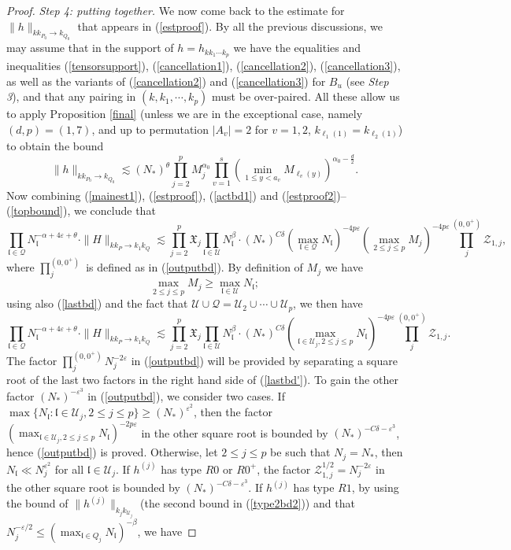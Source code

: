 \documentclass[11 pt,reqno]{amsart}
\theoremstyle{definition}
\theoremstyle{remark}
\numberwithin{equation}{section}
\newcommand{\Qc}{\mathcal{Q}}
\newcommand{\Uc}{\mathcal{U}}
\newcommand{\Zc}{\mathcal{Z}}
\newcommand{\Xf}{\mathfrak{X}}
\newcommand{\lf}{\mathfrak{l}}
\begin{document}
{\begin{proof}
  \emph{Step 4: putting together.} We now come back to the estimate for $\|h\|_{kk_{P_0}\to k_{Q_0}}$ that appears in (\ref{estproof}). By all the previous discussions, we may assume that in the support of $h=h_{kk_1\cdots k_p}$ we have the equalities and inequalities (\ref{tensorsupport}), (\ref{cancellation1}), (\ref{cancellation2}), (\ref{cancellation3}), as well as the variants of (\ref{cancellation2}) and (\ref{cancellation3}) for $B_u$ (see \emph{Step 3}), and that any pairing in $(k,k_1,\cdots,k_p)$ must be over-paired.  All these allow us to apply Proposition \ref{final} (unless we are in the exceptional case, namely $(d,p)=(1,7)$, and up to permutation $|A_v|=2$ for $v=1, 2$, $k_{\ell_1(1)}=k_{\ell_2(1)}$) to obtain the bound
\begin{equation}
\label{topbound}\|h\|_{kk_{P_0}\to k_{Q_0}}\lesssim (N_*)^\theta\prod_{j=2}^{p}M_j^{\alpha_0}\prod_{v=1}^s(\min_{1\leq y<a_v}M_{\ell_v(y)})^{\alpha_0-\frac{d}{2}}.
\end{equation} Now combining (\ref{mainest1}), (\ref{estproof}), (\ref{actbd1}) and (\ref{estproof2})--(\ref{topbound}), we conclude that
\begin{equation}\label{lastbd}\prod_{\lf\in\Qc}N_\lf^{-\alpha+4\varepsilon+\theta}\cdot\|H\|_{kk_P\to k_1k_Q}\lesssim \prod_{j=2}^{p}\Xf_j\prod_{\lf\in\Uc}N_\lf^\beta\cdot (N_*)^{C\delta}(\max_{\lf\in\Qc}N_\lf)^{-4p\varepsilon}(\max_{2\leq j\leq p}M_j)^{-4p\varepsilon}\prod_j^{(0,0^+)}\Zc_{1,j},
\end{equation} 
where $\prod_j^{(0,0^+)}$ is defined as in (\ref{outputbd}). By definition of $M_j$ we have \[
\max_{2\leq j\leq p}M_j\geq\max_{\lf\in\Uc}N_\lf;\]
using also (\ref{lastbd}) and the fact that $\Uc \cup \Qc =\Uc_2\cup\cdots\cup \Uc_p$, we then have 
\begin{equation}\label{lastbd'}\prod_{\lf\in\Qc}N_\lf^{-\alpha+4\varepsilon+\theta}\cdot\|H\|_{kk_P\to k_1k_Q}\lesssim \prod_{j=2}^{p}\Xf_j\prod_{\lf\in\Uc}N_\lf^\beta\cdot (N_*)^{C\delta}(\max_{\lf\in\Uc_j, 2\leq j\leq p}N_\lf)^{-4p\varepsilon}\prod_j^{(0,0^+)}\Zc_{1,j}.
\end{equation} 
The factor $\prod_{j}^{(0,0^+)}N_j^{-2\varepsilon}$ in (\ref{outputbd}) will be provided by separating a square root of  the last two factors in the right hand side of (\ref{lastbd'}). 
To gain the other factor $(N_*)^{-\varepsilon^3}$ in (\ref{outputbd}), we consider two cases.
If $\max\{N_\lf:\lf\in\Uc_j,2\leq j\leq p\}\geq (N_*)^{\varepsilon^2}$, then the factor $(\max_{\lf\in\Uc_j, 2\leq j\leq p}N_\lf)^{-2p\varepsilon}$ in the other square root is bounded by $(N_*)^{-C\delta- \varepsilon^3}$, hence (\ref{outputbd}) is proved. Otherwise, let $2\leq j\leq p$ be such that $N_j=N_*$, then $N_\lf\ll N_j^{\varepsilon^2}$ for all $\lf\in\Uc_j$. If $h^{(j)}$ has type $R0$ or $R0^+$, the factor $\Zc_{1,j}^{1/2}=N_j^{-2\varepsilon}$ in the other square root  is bounded by $(N_*)^{-C\delta- \varepsilon^3}$. If $h^{(j)}$ has type $R1$, by using the bound of $\|h^{(j)}\|_{k_jk_{\Uc_j}}$ (the second bound in (\ref{type2bd2})) and that $N_j^{-\varepsilon/2}\leq (\max_{\lf\in Q_j}N_\lf)^{-\beta}$, we have 

\end{proof}}
\end{document}
